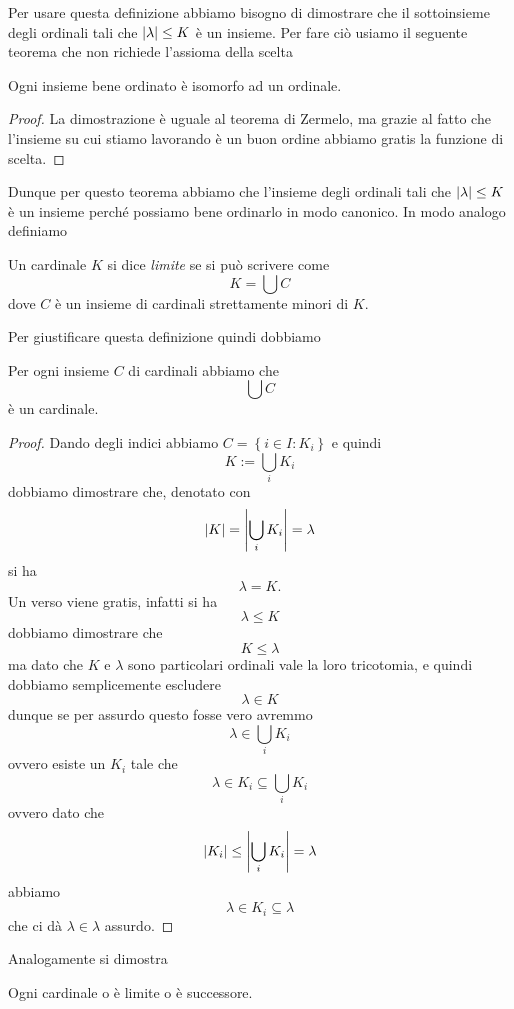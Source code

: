 \documentclass[11pt]{scrartcl}
\begin{document}
 	Per usare questa definizione abbiamo bisogno di dimostrare che il sottoinsieme degli ordinali tali che $\left\lvert \lambda \right\rvert\le K$ è un insieme. Per fare ciò usiamo il seguente teorema che non richiede l'assioma della scelta
 	\begin{theorem}
 		Ogni insieme bene ordinato è isomorfo ad un ordinale.
 	\end{theorem} 
 	\begin{proof}
 		La dimostrazione è uguale al teorema di Zermelo, ma grazie al fatto che l'insieme su cui stiamo lavorando è un buon ordine abbiamo gratis la funzione di scelta.
 	\end{proof}
 	Dunque per questo teorema abbiamo che l'insieme degli ordinali tali che $\left\lvert \lambda \right\rvert\le K$ è un insieme perché possiamo bene ordinarlo in modo canonico.
 	In modo analogo definiamo
 	\begin{definition}
 		Un cardinale $K$ si dice \textit{limite} se si può scrivere come
 		$$K=\bigcup C$$
 		dove $C$ è un insieme di cardinali strettamente minori di $K$.
 	\end{definition}
 	Per giustificare questa definizione quindi dobbiamo
 	\begin{proposition}
 		Per ogni insieme $C$ di cardinali abbiamo che 
 		$$\bigcup C$$
 		è un cardinale.
 	\end{proposition}
 	\begin{proof}
 		Dando degli indici abbiamo $C=\left\{i\in I:K_i\right\}$ e quindi
 		$$K:=\bigcup_i K_i$$
 		dobbiamo dimostrare che, denotato con
 		$$\left\lvert K \right\rvert=\left\lvert \bigcup_i K_i \right\rvert=\lambda$$
 		si ha 
 		$$\lambda=K.$$
 		Un verso viene gratis, infatti si ha
 		$$\lambda\le K$$
 		dobbiamo dimostrare che 
 		$$K\le \lambda$$
 		ma dato che $K$ e $\lambda$ sono particolari ordinali vale la loro tricotomia, e quindi dobbiamo semplicemente escludere 
 		$$\lambda\in K$$
 		dunque se per assurdo questo fosse vero avremmo
 		$$\lambda\in \bigcup_i K_i$$
 		ovvero esiste un $K_i$ tale che
 		$$\lambda\in K_i\subseteq \bigcup_i K_i$$
 		ovvero dato che
 		$$\left\lvert K_i \right\rvert\le \left\lvert \bigcup_i K_i \right\rvert=\lambda$$
 		abbiamo
 		$$\lambda\in K_i \subseteq \lambda$$
 		che ci dà $\lambda\in \lambda$ assurdo.
 	\end{proof}
 	Analogamente si dimostra
 	\begin{proposition}
 		Ogni cardinale o è limite o è successore.
 	\end{proposition}
\end{document}
